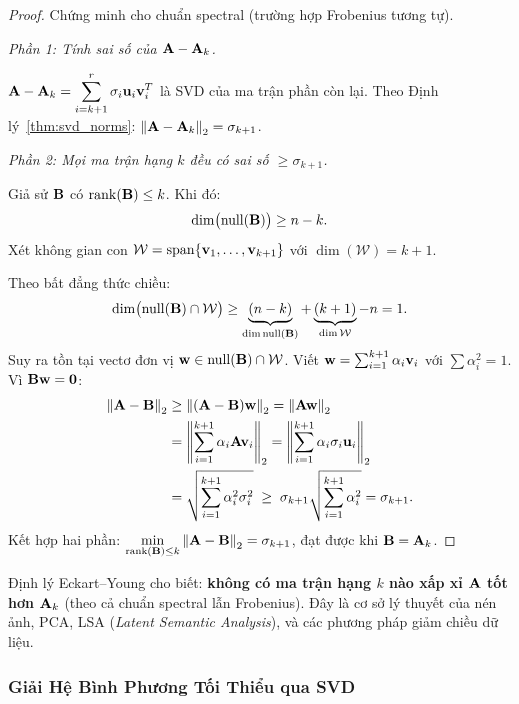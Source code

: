 \begin{proof}
Chứng minh cho chuẩn spectral (trường hợp Frobenius tương tự).

\medskip
\noindent\textit{Phần 1: Tính sai số của $\mathbf{A} - \mathbf{A}_k$.}

$\mathbf{A} - \mathbf{A}_k = \displaystyle\sum_{i=k+1}^{r}\sigma_i\mathbf{u}_i\mathbf{v}_i^T$
là SVD của ma trận phần còn lại. Theo Định lý~\ref{thm:svd_norms}:
$\left\lVert\mathbf{A} - \mathbf{A}_k\right\rVert_2 = \sigma_{k+1}$.

\medskip
\noindent\textit{Phần 2: Mọi ma trận hạng $k$ đều có sai số $\geq \sigma_{k+1}$.}

Giả sử $\mathbf{B}$ có $\operatorname{rank}(\mathbf{B}) \leq k$. Khi đó:
\[
    \dim\bigl(\operatorname{null}(\mathbf{B})\bigr) \geq n - k.
\]
Xét không gian con $\mathcal{W} = \operatorname{span}\{\mathbf{v}_1, \ldots, \mathbf{v}_{k+1}\}$
với $\dim(\mathcal{W}) = k+1$.

Theo bất đẳng thức chiều:
\[
    \dim\bigl(\operatorname{null}(\mathbf{B}) \cap \mathcal{W}\bigr)
    \geq \underbrace{(n-k)}_{\dim\operatorname{null}(\mathbf{B})}
    + \underbrace{(k+1)}_{\dim\mathcal{W}} - n = 1.
\]
Suy ra tồn tại vectơ đơn vị $\mathbf{w} \in \operatorname{null}(\mathbf{B}) \cap \mathcal{W}$.
Viết $\mathbf{w} = \sum_{i=1}^{k+1}\alpha_i\mathbf{v}_i$ với $\sum\alpha_i^2 = 1$.
Vì $\mathbf{B}\mathbf{w} = \mathbf{0}$:
\begin{align*}
    \left\lVert\mathbf{A} - \mathbf{B}\right\rVert_2
    &\geq \left\lVert(\mathbf{A} - \mathbf{B})\mathbf{w}\right\rVert_2
    = \left\lVert\mathbf{A}\mathbf{w}\right\rVert_2 \\
    &= \left\|\sum_{i=1}^{k+1}\alpha_i\mathbf{A}\mathbf{v}_i\right\|_2
    = \left\|\sum_{i=1}^{k+1}\alpha_i\sigma_i\mathbf{u}_i\right\|_2 \\
    &= \sqrt{\sum_{i=1}^{k+1}\alpha_i^2\sigma_i^2}
    \;\geq\; \sigma_{k+1}\sqrt{\sum_{i=1}^{k+1}\alpha_i^2}
    = \sigma_{k+1}.
\end{align*}
Kết hợp hai phần: $\displaystyle\min_{\operatorname{rank}(\mathbf{B})\leq k}\left\lVert\mathbf{A}-\mathbf{B}\right\rVert_2 = \sigma_{k+1}$,
đạt được khi $\mathbf{B} = \mathbf{A}_k$.
\end{proof}

\begin{note}
Định lý Eckart--Young cho biết: \textbf{không có ma trận hạng $k$ nào xấp xỉ $\mathbf{A}$
tốt hơn $\mathbf{A}_k$} (theo cả chuẩn spectral lẫn Frobenius). Đây là cơ sở lý thuyết
của nén ảnh, PCA, LSA (\textit{Latent Semantic Analysis}), và các phương pháp
giảm chiều dữ liệu.
\end{note}


\subsubsection{Giải Hệ Bình Phương Tối Thiểu qua SVD}

